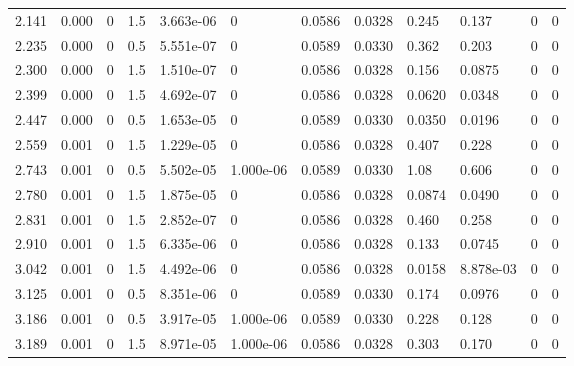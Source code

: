 \documentclass[preview]{standalone}
\begin{document}
{{\begin{tabular}{L{1.2cm}C{1.2cm} C{0.3cm}C{0.5cm} C{1.4cm}C{1.4cm} C{1.4cm}C{1.4cm} C{1.6cm}C{1.6cm} C{1.6cm}C{1.6cm}}
  2.141  &  0.000  & 0     & 1.5 &  3.663e-06  & 0  &  0.0586&   0.0328& 0.245 & 0.137   &  0 & 0  \\ 
  2.235  &  0.000  & 0     & 0.5 &  5.551e-07  & 0  &  0.0589&   0.0330& 0.362 & 0.203   &  0 & 0  \\ 
  2.300  &  0.000  & 0     & 1.5 &  1.510e-07  & 0  &  0.0586&   0.0328& 0.156 & 0.0875   &  0 & 0  \\ 
  2.399  &  0.000  & 0     & 1.5 &  4.692e-07  & 0  &  0.0586&   0.0328& 0.0620 & 0.0348   &  0 & 0  \\ 
  2.447  &  0.000  & 0     & 0.5 &  1.653e-05  & 0  &  0.0589&   0.0330& 0.0350 & 0.0196   &  0 & 0  \\ 
  2.559  &  0.001  & 0     & 1.5 &  1.229e-05  & 0  &  0.0586&   0.0328& 0.407 & 0.228   &  0 & 0  \\ 
  2.743  &  0.001  & 0     & 0.5 &  5.502e-05  & 1.000e-06  &  0.0589&   0.0330& 1.08 & 0.606   &  0 & 0  \\ 
  2.780  &  0.001  & 0     & 1.5 &  1.875e-05  & 0  &  0.0586&   0.0328& 0.0874 & 0.0490   &  0 & 0  \\ 
  2.831  &  0.001  & 0     & 1.5 &  2.852e-07  & 0  &  0.0586&   0.0328& 0.460 & 0.258   &  0 & 0  \\ 
  2.910  &  0.001  & 0     & 1.5 &  6.335e-06  & 0  &  0.0586&   0.0328& 0.133 & 0.0745   &  0 & 0  \\ 
  3.042  &  0.001  & 0     & 1.5 &  4.492e-06  & 0  &  0.0586&   0.0328& 0.0158 & 8.878e-03   &  0 & 0  \\ 
  3.125  &  0.001  & 0     & 0.5 &  8.351e-06  & 0  &  0.0589&   0.0330& 0.174 & 0.0976   &  0 & 0  \\ 
  3.186  &  0.001  & 0     & 0.5 &  3.917e-05  & 1.000e-06  &  0.0589&   0.0330& 0.228 & 0.128   &  0 & 0  \\ 
  3.189  &  0.001  & 0     & 1.5 &  8.971e-05  & 1.000e-06  &  0.0586&   0.0328& 0.303 & 0.170   &  0 & 0  \\ 
\hline 
\end{tabular} 

}}
\end{document}
